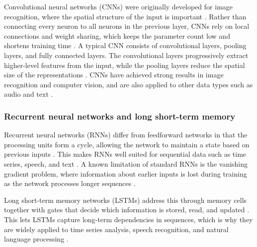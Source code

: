Convolutional neural networks (CNNs) were originally developed 
for image recognition, where the spatial structure of the input 
is important \parencite{lecun2015deep_learning, lecun1998cnn}. 
Rather than connecting every neuron to all neurons in the previous 
layer, CNNs rely on local connections and weight sharing, which keeps 
the parameter count low and shortens training time 
\parencite{shrestha2019review_deep_learning_algorithms_architectures}. 
A typical CNN consists of convolutional layers, pooling layers, and fully 
connected layers. The convolutional layers progressively extract higher-level 
features from the input, while the pooling layers reduce the spatial size of 
the representations 
\parencite{pouyanfar2018survey_deep_learning_algorithms, 
sarker2021machine_learning_algorithms_real_world_applications_research_directions}. 
CNNs have achieved strong results in image recognition and computer vision, 
and are also applied to other data types such as audio and text 
\parencite{lecun2015deep_learning, pouyanfar2018survey_deep_learning_algorithms}.

\subsubsection*{Recurrent neural networks and long short-term memory}

Recurrent neural networks (RNNs) differ from feedforward networks in that 
the processing units form a cycle, allowing the network to maintain a state 
based on previous inputs 
\parencite{shrestha2019review_deep_learning_algorithms_architectures}. 
This makes RNNs well suited for sequential data such as time series, speech, 
and text 
\parencite{lecun2015deep_learning, pouyanfar2018survey_deep_learning_algorithms}. 
A known limitation of standard RNNs is the vanishing gradient problem, 
where information about earlier inputs is lost during training as the network 
processes longer sequences 
\parencite{pouyanfar2018survey_deep_learning_algorithms, 
shrestha2019review_deep_learning_algorithms_architectures}.

Long short-term memory networks (LSTMs) address this through memory 
cells together with gates that decide which information is stored, 
read, and updated 
\parencite{hochreiter1997lstm, 
shrestha2019review_deep_learning_algorithms_architectures}. 
This lets LSTMs capture long-term dependencies in sequences, which 
is why they are widely applied to time series analysis, speech 
recognition, and natural language processing 
\parencite{lecun2015deep_learning, 
sarker2021machine_learning_algorithms_real_world_applications_research_directions}.

